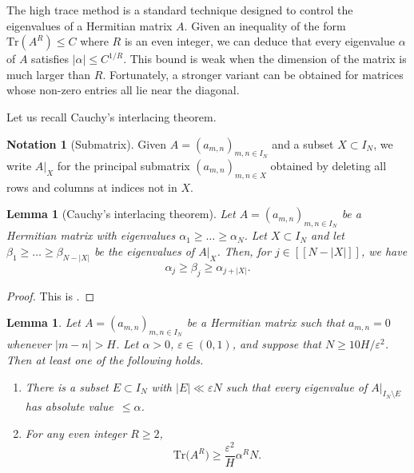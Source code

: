 \documentclass[11pt]{amsart}
\newtheorem{lemma}[theorem]{Lemma}
\theoremstyle{definition}
\newtheorem{notation}[theorem]{Notation}
\renewcommand{\leq}{\leqslant}
\renewcommand{\geq}{\geqslant}
\newcommand{\sinterval}[1]{[\![#1]\!] }
\newcommand{\eps}{\varepsilon}
\newcommand{\Tr}{\mathrm{Tr}}
\newcommand{\N}{I_N}
\newcommand{\tupsize}{R}
\begin{document}
The high trace method is a standard technique designed to control the eigenvalues of a Hermitian matrix $A$. Given an inequality of the form $\Tr(A^{\tupsize})\leq C$ where $\tupsize$ is an even integer, we can deduce that every eigenvalue $\alpha$ of $A$ satisfies $|\alpha| \leq C^{1/\tupsize}$. This bound is weak when the dimension of the matrix is much larger than $\tupsize$. Fortunately, a stronger variant can be obtained for matrices whose non-zero entries all lie near the diagonal.

Let us recall Cauchy's interlacing theorem. 

\begin{notation}[Submatrix]
\label{not:restriction}
Given $A = (a_{m,n})_{m,n\in \N}$ and a subset $X\subset \N$, we write $A|_{X}$ for the principal submatrix $(a_{m,n})_{m,n\in X}$ obtained by deleting all rows and columns at indices not in $X$.
\end{notation}

\begin{lemma}[Cauchy's interlacing theorem]
\label{lem:cauchy}
Let $A = (a_{m,n})_{m,n\in \N}$ be a Hermitian matrix with eigenvalues $\alpha_1 \geq \ldots \geq \alpha_N$. Let $X\subset \N$ and let $\beta_1 \geq \ldots \geq \beta_{N-|X|}$ be the eigenvalues of $A|_{X}$. Then, for $j\in  \sinterval{N-|X|}$, we have 
\begin{equation*}
	\alpha_j \geq \beta_j \geq \alpha_{j+|X|}.
\end{equation*}
\end{lemma}
\begin{proof}
This is \cite[Corollary~III.1.5]{matrixanalysis}.
\end{proof}

\begin{lemma}
\label{prop:traceeigenvalues}
Let $A  = (a_{m, n})_{m, n\in \N}$ be a Hermitian matrix such that $a_{m,n} = 0$ whenever $|m-n| > H$. Let $\alpha>0$, $\eps\in (0,1)$, and suppose that $N \geq 10H/\eps^2$. Then at least one of the following holds.
\begin{enumerate}
	\item There is a subset $E\subset \N$ with $|E| \ll \eps N$ such that every eigenvalue of $A|_{\N\setminus E}$ has absolute value~$\leq \alpha$.
	\item For any even integer $\tupsize\geq 2$, 
	\begin{equation*}
		\Tr \big(A^{\tupsize}\big) \geq \frac{\eps^2}{H} \alpha^{\tupsize}N.
	\end{equation*}
\end{enumerate}
\end{lemma}
\end{document}

